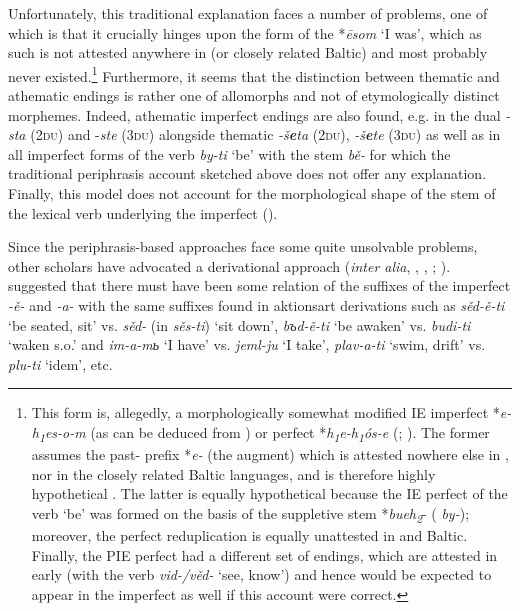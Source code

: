 \documentclass[output=paper]{langsci/langscibook}
\begin{document}
Unfortunately, this traditional explanation faces a number of problems, one of which is that it crucially hinges upon the form of the  *\textit{ēsom} ‘I was’, which as such is not attested anywhere in  (or closely related Baltic) and most probably never existed.\footnote{This form is, allegedly, a morphologically somewhat modified IE imperfect *\textit{e-h\textsubscript{1}es-o-m} (as can be deduced from \citealt[196]{Leskien1919}) or perfect *\textit{h\textsubscript{1}e-h\textsubscript{1}ós-e} (\citealt[82]{Stang1942}; \citealt[253]{Kortlandt1986}). The former assumes the past- prefix *\textit{e-} (the augment) which is attested nowhere else in , nor in the closely related Baltic languages, and is therefore highly hypothetical \citep[349]{Pohl1971}. The latter is equally hypothetical because the IE perfect of the verb ‘be’ was formed on the basis of the suppletive stem *\textit{bueh\textsubscript{2}}- ( \textit{by-}); moreover, the perfect reduplication is equally unattested in  and Baltic. Finally, the PIE perfect had a different set of endings, which are attested in early  (with the verb \textit{vid-/věd-} ‘see, know’) and hence would be expected to appear in the imperfect as well if this account were correct.}   Furthermore, it seems that the distinction between thematic and athematic endings is rather one of allomorphs and not of etymologically distinct morphemes. Indeed, athematic imperfect endings are also found, e.g. in the dual \textit{-sta} (\textsc{2du}) and -\textit{ste} (\textsc{3du}) alongside thematic \textit{-š\textbf{{e}}ta} (\textsc{2du}), \textit{-š\textbf{{e}}te} (\textsc{3du}) \citep[349]{Pohl1971} as well as in all imperfect forms of the verb \textit{by-ti} ‘be’ with the stem \textit{bě-} for which the traditional periphrasis account sketched above does not offer any explanation. Finally, this model does not account for the morphological shape of the stem of the lexical verb underlying the imperfect (\citealt[349–350]{Pohl1971}).\newpage

Since the periphrasis-based approaches face some quite unsolvable problems, other scholars have advocated a derivational approach (\textit{inter alia}, \citealt{Kuryłowicz1937}, \citeyear{Kuryłowicz1960}, \citealt{Bech1971}; \citealt[285]{Arumaa1985}).  \citet[142–143]{Maslov2004[1954]} suggested that there must have been some relation of the suffixes of the imperfect \textit{-ě-} and \textit{-a-} with the same suffixes found in aktionsart derivations such as \textit{sěd-ě-ti} ‘be seated, sit’ vs. \textit{sěd-} (in \textit{sěs-ti}) ‘sit down’, \textit{b}\textit{ъ}\textit{d-ě-ti} ‘be awaken’ vs. \textit{budi-ti} ‘waken s.o.’ and \textit{im-a-m}\textit{ь} ‘I have’ vs. \textit{jeml-ju} ‘I take’, \textit{plav-a-ti} ‘swim, drift’ vs. \textit{plu-ti} ‘idem’, etc.
\end{document}

